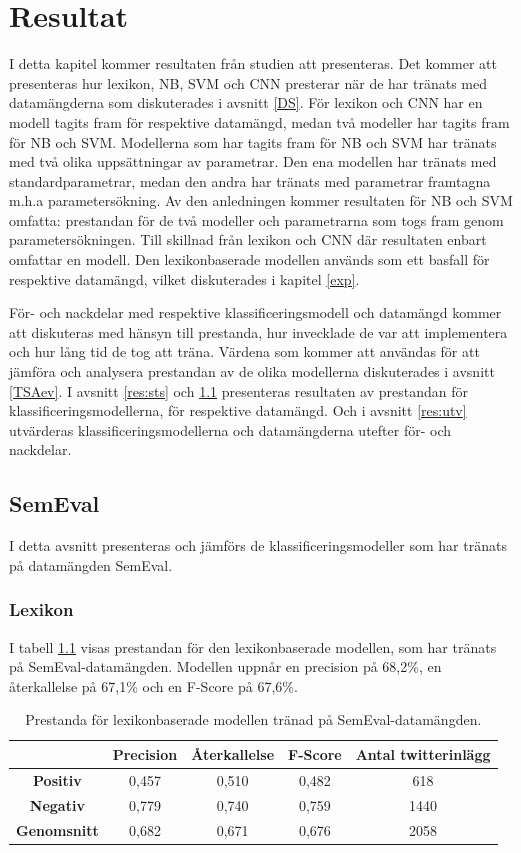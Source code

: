 \documentclass{kaumasters} %
\begin{document}
\chapter{Resultat} \label{res}
I detta kapitel kommer resultaten från studien att presenteras. Det kommer att presenteras hur lexikon, NB, SVM och CNN presterar när de har tränats med datamängderna som diskuterades i avsnitt \ref{DS}. För lexikon och CNN har en modell tagits fram för respektive datamängd, medan två modeller har tagits fram för NB och SVM. Modellerna som har tagits fram för NB och SVM har tränats med två olika uppsättningar av parametrar. Den ena modellen har tränats med standardparametrar, medan den andra har tränats med parametrar framtagna m.h.a parametersökning. Av den anledningen kommer resultaten för NB och SVM omfatta: prestandan för de två modeller och parametrarna som togs fram genom parametersökningen. Till skillnad från lexikon och CNN där resultaten enbart omfattar en modell. Den lexikonbaserade modellen används som ett basfall för respektive datamängd, vilket diskuterades i kapitel \ref{exp}.

För- och nackdelar med respektive klassificeringsmodell och datamängd kommer att diskuteras med hänsyn till prestanda, hur invecklade de var att implementera och hur lång tid de tog att träna. Värdena som kommer att användas för att jämföra och analysera prestandan av de olika modellerna diskuterades i avsnitt \ref{TSAev}. I avsnitt \ref{res:sts} och \ref{res:se} presenteras resultaten av prestandan för klassificeringsmodellerna, för respektive datamängd. Och i avsnitt \ref{res:utv} utvärderas klassificeringsmodellerna och datamängderna utefter för- och nackdelar.

\section{SemEval}\label{res:se}
I detta avsnitt presenteras och jämförs de klassificeringsmodeller som har tränats på datamängden SemEval. 
\subsection{Lexikon}
I tabell \ref{tab:lexi_se} visas prestandan för den lexikonbaserade modellen, som har tränats på SemEval-datamängden. Modellen uppnår en precision på 68,2\%, en återkallelse på 67,1\% och en F-Score på 67,6\%. 

\begin{table}[H]
\centering
\caption{Prestanda för lexikonbaserade modellen tränad på SemEval-datamängden.}
\label{tab:lexi_se}
    \begin{tabular}{ccccc}
    \toprule
     & \textbf{Precision} & \textbf{Återkallelse} & \textbf{F-Score} & \textbf{Antal twitterinlägg}  \\
    \midrule
    \textbf{Positiv} & 0,457 & 0,510 & 0,482 & 618 \\
    \textbf{Negativ} & 0,779 & 0,740 & 0,759 & 1440 \\
    \midrule
    \textbf{Genomsnitt} & 0,682 & 0,671 & 0,676  & 2058 \\
    \bottomrule
\end{tabular}
\end{table}
\end{document}
